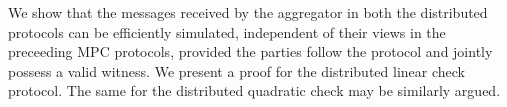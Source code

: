 \begin{comment}
\item Oracle Answers: The oracle responds with columns $\pi[\cdot,k]$ for $k\in
Q$.
\item $\verifier$ checks: The verifier checks $\sum_{i\in
[p]}r_i\pi[i,k]=\sum_{i\in [\ell]}\mc{T}[i,k]\tilde{c}_i$ for $k\in Q$.
\item $\verifier$ accepts if the above check succeeds and $b=1$. 
\end{enumerate}
\end{itemize}
\end{framed}
\caption{Distributed 3D Proximity Protocol}
\label{fig:distprox3d}
\end{figure}
\end{comment} 

We show that the messages received by the
aggregator in both the distributed protocols can be efficiently simulated, independent of
their views in the preceeding MPC protocols, provided the parties follow the
protocol and jointly possess a valid witness. We present a proof for the
distributed linear check protocol. The same for the distributed quadratic check
may be similarly argued.


